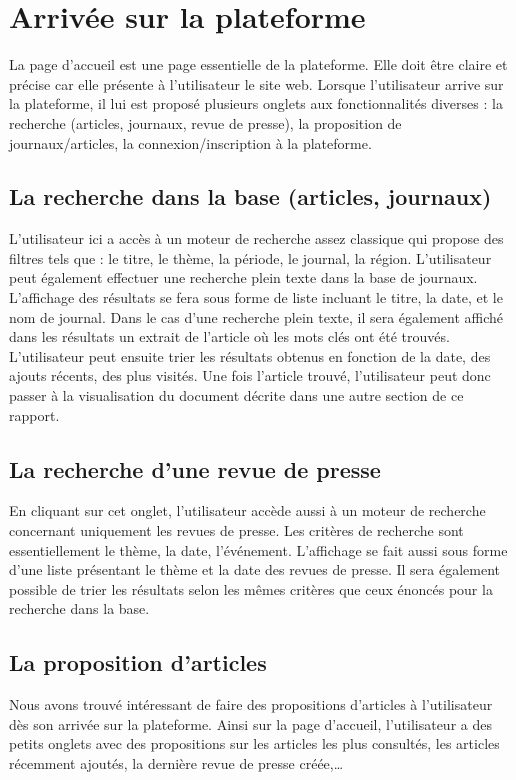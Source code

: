 \section{Arrivée sur la plateforme}
\label{sec:arrivee}

La page d’accueil est une page essentielle de la plateforme. Elle doit être claire et précise car elle présente à l’utilisateur le site web.
Lorsque l’utilisateur arrive sur la plateforme, il lui est proposé plusieurs onglets aux fonctionnalités diverses : la recherche (articles, journaux, revue de presse), la proposition de journaux/articles, la connexion/inscription à la plateforme.

\subsection{La recherche dans la base (articles, journaux)}
\label{sec:arrivee_recherche}
L’utilisateur ici a accès à un moteur de recherche assez classique qui propose des filtres tels que : le titre, le thème, la période, le journal, la région. L’utilisateur peut également effectuer une recherche plein texte dans la base de journaux. L’affichage des résultats se fera sous forme de liste incluant le titre, la date, et le nom de journal. Dans le cas d’une recherche plein texte, il sera également affiché dans les résultats un extrait de l’article où les mots clés ont été trouvés. L’utilisateur peut ensuite trier les résultats obtenus en fonction de la date, des ajouts récents, des plus visités. Une fois l’article trouvé, l’utilisateur peut donc passer à la visualisation du document décrite dans une autre section de ce rapport.

\subsection{La recherche d’une revue de presse}
\label{sec:arrivee_revue}
En cliquant sur cet onglet, l’utilisateur accède aussi à un moteur de recherche concernant uniquement les revues de presse. Les critères de recherche sont essentiellement le thème, la date, l’événement. L’affichage se fait aussi sous forme d’une liste présentant le thème et la date des revues de presse. Il sera également possible de trier les résultats selon les mêmes critères que ceux énoncés pour la recherche dans la base.

\subsection{La proposition d’articles}
\label{sec:arrivee_article}
Nous avons trouvé intéressant de faire des propositions d’articles à l’utilisateur dès son arrivée sur la plateforme. Ainsi sur la page d’accueil, l’utilisateur a des petits onglets avec des propositions sur les articles les plus consultés, les articles récemment ajoutés, la dernière revue de presse créée,…

